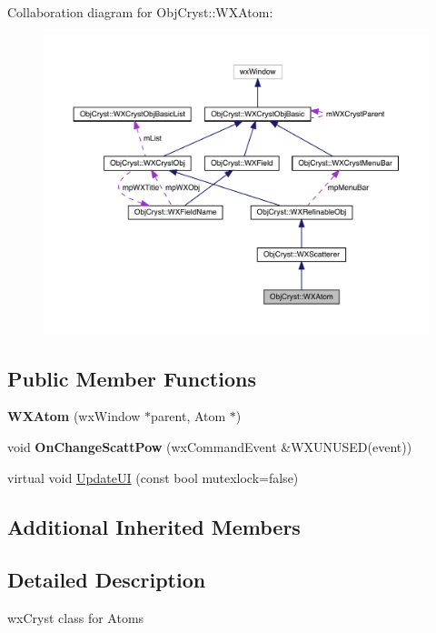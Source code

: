 Collaboration diagram for Obj\+Cryst\+::W\+X\+Atom\+:
\nopagebreak
\begin{figure}[H]
\begin{center}
\leavevmode
\includegraphics[width=350pt]{class_obj_cryst_1_1_w_x_atom__coll__graph}
\end{center}
\end{figure}
\subsection*{Public Member Functions}
\begin{DoxyCompactItemize}
\item 
\mbox{\label{class_obj_cryst_1_1_w_x_atom_ad5013fde76bd65b8327976ee3d7b4538}} 
{\bfseries W\+X\+Atom} (wx\+Window $\ast$parent, Atom $\ast$)
\item 
\mbox{\label{class_obj_cryst_1_1_w_x_atom_a761d4b22d56c314568884ce001ae53d5}} 
void {\bfseries On\+Change\+Scatt\+Pow} (wx\+Command\+Event \&W\+X\+U\+N\+U\+S\+ED(event))
\item 
virtual void \mbox{\hyperlink{class_obj_cryst_1_1_w_x_atom_a09c1212622fe6bb17ca8443455370551}{Update\+UI}} (const bool mutexlock=false)
\end{DoxyCompactItemize}
\subsection*{Additional Inherited Members}


\subsection{Detailed Description}
wx\+Cryst class for Atoms 

